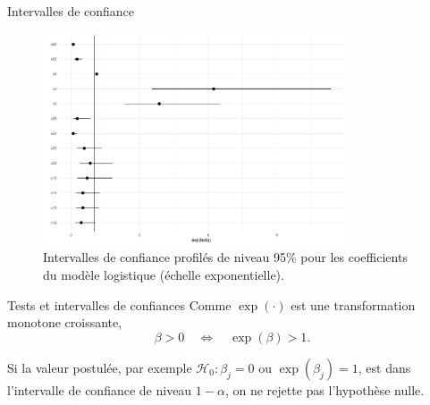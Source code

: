 \documentclass[
  ignorenonframetext,
]{beamer}
\begin{document}
\begin{frame}{Intervalles de confiance}
\protect\hypertarget{intervalles-de-confiance}{}
\begin{figure}

{\centering \includegraphics[width=0.8\textwidth,height=\textheight]{MATH60602-diapos6_files/figure-beamer/fig-confint-modele2-logist-1.pdf}

}

\caption{\label{fig-confint-modele2-logist}Intervalles de confiance
profilés de niveau 95\% pour les coefficients du modèle logistique
(échelle exponentielle).}

\end{figure}
\end{frame}

\begin{frame}{Tests et intervalles de confiances}
\protect\hypertarget{tests-et-intervalles-de-confiances}{}
Comme \(\exp(\cdot)\) est une transformation monotone croissante,
\[\beta>0 \quad \iff \quad \exp(\beta)>1.\]

Si la valeur postulée, par exemple \(\mathscr{H}_0: \beta_j=0\) ou
\(\exp(\beta_j)=1\), est dans l'intervalle de confiance de niveau
\(1-\alpha\), on ne rejette pas l'hypothèse nulle.
\end{frame}
\end{document}
